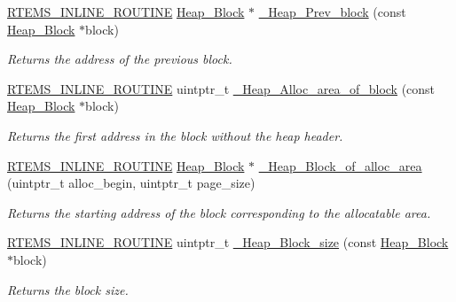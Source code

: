 \begin{DoxyCompactItemize}
\mbox{\hyperlink{group__RTEMSScoreBaseDefs_gac216239df231d5dbd15e3520b0b9313f}{R\+T\+E\+M\+S\+\_\+\+I\+N\+L\+I\+N\+E\+\_\+\+R\+O\+U\+T\+I\+NE}} \mbox{\hyperlink{structHeap__Block}{Heap\+\_\+\+Block}} $\ast$ \mbox{\hyperlink{group__RTEMSScoreHeap_ga1f927e073f140a91ccbd846879984de6}{\+\_\+\+Heap\+\_\+\+Prev\+\_\+block}} (const \mbox{\hyperlink{structHeap__Block}{Heap\+\_\+\+Block}} $\ast$block)
\begin{DoxyCompactList}\small\item\em Returns the address of the previous block. \end{DoxyCompactList}\item 
\mbox{\hyperlink{group__RTEMSScoreBaseDefs_gac216239df231d5dbd15e3520b0b9313f}{R\+T\+E\+M\+S\+\_\+\+I\+N\+L\+I\+N\+E\+\_\+\+R\+O\+U\+T\+I\+NE}} uintptr\+\_\+t \mbox{\hyperlink{group__RTEMSScoreHeap_ga2563e03746d89148a8782b02f6159821}{\+\_\+\+Heap\+\_\+\+Alloc\+\_\+area\+\_\+of\+\_\+block}} (const \mbox{\hyperlink{structHeap__Block}{Heap\+\_\+\+Block}} $\ast$block)
\begin{DoxyCompactList}\small\item\em Returns the first address in the block without the heap header. \end{DoxyCompactList}\item 
\mbox{\hyperlink{group__RTEMSScoreBaseDefs_gac216239df231d5dbd15e3520b0b9313f}{R\+T\+E\+M\+S\+\_\+\+I\+N\+L\+I\+N\+E\+\_\+\+R\+O\+U\+T\+I\+NE}} \mbox{\hyperlink{structHeap__Block}{Heap\+\_\+\+Block}} $\ast$ \mbox{\hyperlink{group__RTEMSScoreHeap_gafd70a7d05fc0c46a87ff68d759ab3af3}{\+\_\+\+Heap\+\_\+\+Block\+\_\+of\+\_\+alloc\+\_\+area}} (uintptr\+\_\+t alloc\+\_\+begin, uintptr\+\_\+t page\+\_\+size)
\begin{DoxyCompactList}\small\item\em Returns the starting address of the block corresponding to the allocatable area. \end{DoxyCompactList}\item 
\mbox{\hyperlink{group__RTEMSScoreBaseDefs_gac216239df231d5dbd15e3520b0b9313f}{R\+T\+E\+M\+S\+\_\+\+I\+N\+L\+I\+N\+E\+\_\+\+R\+O\+U\+T\+I\+NE}} uintptr\+\_\+t \mbox{\hyperlink{group__RTEMSScoreHeap_ga161ac37dea0961191b2698abf0e61841}{\+\_\+\+Heap\+\_\+\+Block\+\_\+size}} (const \mbox{\hyperlink{structHeap__Block}{Heap\+\_\+\+Block}} $\ast$block)
\begin{DoxyCompactList}\small\item\em Returns the block size. \end{DoxyCompactList}\item 

\end{DoxyCompactItemize}
